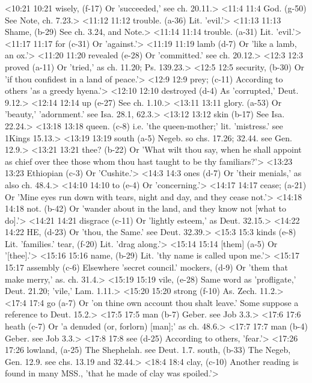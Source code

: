 <10:21 10:21  wisely, (f-17)  Or 'succeeded,' see ch. 20.11.>
<11:4 11:4  God. (g-50)  See Note, ch. 7.23.>
<11:12 11:12  trouble. (a-36)  Lit. 'evil.'>
<11:13 11:13  Shame, (b-29)  See ch. 3.24, and Note.>
<11:14 11:14  trouble. (a-31)  Lit. 'evil.'>
<11:17 11:17  for (c-31)  Or 'against.'>
<11:19 11:19  lamb (d-7)  Or 'like a lamb, an ox.'>
<11:20 11:20  revealed (e-28)  Or 'committed.' see ch. 20.12.>
<12:3 12:3  proved (a-11)  Or 'tried,' as ch. 11.20; Ps. 139.23.>
<12:5 12:5  security, (b-30)  Or 'if thou confidest in a land of peace.'>
<12:9 12:9  prey; (c-11)  According to others 'as a greedy hyena.'>
<12:10 12:10  destroyed (d-4)  As 'corrupted,' Deut. 9.12.>
<12:14 12:14  up (e-27)  See ch. 1.10.>
<13:11 13:11  glory. (a-53)  Or 'beauty,' 'adornment.' see Isa. 28.1, 62.3.>
<13:12 13:12  skin (b-17)  See Isa. 22.24.>
<13:18 13:18  queen. (c-8)  i.e. 'the queen-mother;' lit. 'mistress.' see 1Kings 15.13.>
<13:19 13:19  south (a-5)  Negeb. so chs. 17.26; 32.44. see Gen. 12.9.>
<13:21 13:21  thee? (b-22)  Or 'What wilt thou say, when he shall appoint as chief over  thee those whom thou hast taught to be thy familiars?'>
<13:23 13:23  Ethiopian (c-3)  Or 'Cushite.'>
<14:3 14:3  ones (d-7)  Or 'their menials,' as also ch. 48.4.>
<14:10 14:10  to (e-4)  Or 'concerning.'>
<14:17 14:17  cease; (a-21)  Or 'Mine eyes run down with tears, night and day, and they  cease not.'>
<14:18 14:18  not. (b-42)  Or 'wander about in the land, and they know not [what to  do].'>
<14:21 14:21  disgrace (c-11)  Or 'lightly esteem,' as Deut. 32.15.>
<14:22 14:22  HE, (d-23)  Or 'thou, the Same.' see Deut. 32.39.>
<15:3 15:3  kinds (e-8)  Lit. 'families.'
  tear, (f-20)  Lit. 'drag along.'>
<15:14 15:14  [them] (a-5)  Or '[thee].'>
<15:16 15:16  name, (b-29)  Lit. 'thy name is called upon me.'>
<15:17 15:17  assembly (c-6)  Elsewhere 'secret council.'
  mockers, (d-9)  Or 'them that make merry,' as. ch. 31.4.>
<15:19 15:19  vile, (e-28)  Same word as 'profligate,' Deut. 21.20; 'vile,' Lam. 1.11.>
<15:20 15:20  strong (f-10)  As. Zech. 11.2.>
<17:4 17:4  go (a-7)  Or 'on thine own account thou shalt leave.' Some suppose a  reference to Deut. 15.2.>
<17:5 17:5  man (b-7)  Geber. see Job 3.3.>
<17:6 17:6  heath (c-7)  Or 'a denuded (or, forlorn) [man];' as ch. 48.6.>
<17:7 17:7  man (b-4)  Geber. see Job 3.3.>
<17:8 17:8  see (d-25)  According to others, 'fear.'>
<17:26 17:26  lowland, (a-25)  The Shephelah. see Deut. 1.7.
  south, (b-33)  The Negeb, Gen. 12.9. see chs. 13.19 and 32.44.>
<18:4 18:4  clay, (c-10)  Another reading is found in many MSS., 'that he made of clay  was spoiled.'>
